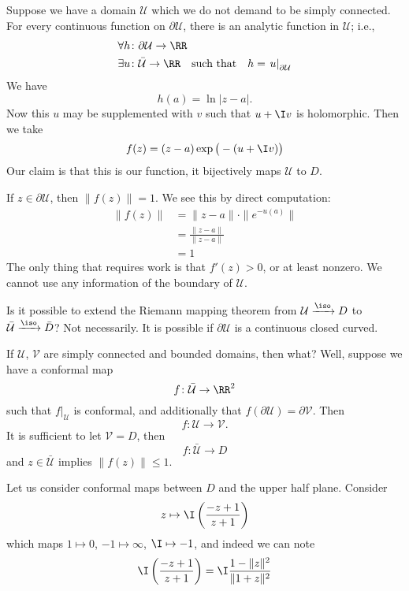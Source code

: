 Suppose we have a domain $\mathcal{U}$ which we do not demand to
be simply connected. For every continuous function on
$\partial\mathcal{U}$, there is an analytic function in
$\mathcal{U}$; i.e.,
\begin{equation}
\begin{split}
&\forall h\colon\partial\mathcal{U}\to\RR\\
&\exists u\colon\bar{\mathcal{U}}\to\RR\quad\mbox{such that}\quad
h=\left.u\right|_{\partial\mathcal{U}}
\end{split}
\end{equation}
We have
\begin{equation}
h(a)=\ln|z-a|.
\end{equation}
Now this $u$ may be supplemented with $v$ such that $u+\I v$ is
holomorphic. Then we take 
\begin{equation}
f(z)=(z-a)\exp\big(-(u+\I v)\big)
\end{equation}
Our claim is that this is our function, it bijectively maps
$\mathcal{U}$ to $D$.

If $z\in\partial\mathcal{U}$, then $\|f(z)\|=1$. We see this by
direct computation:
\begin{subequations}
\begin{align}
\|f(z)\| &= \|z-a\|\cdot\|e^{-u(a)}\|\\
&=\frac{\|z-a\|}{\|z-a\|}\\
&=1
\end{align}
\end{subequations}
The only thing that requires work is that $f'(z)>0$, or at least
nonzero. We cannot use any information of the boundary of
$\mathcal{U}$. 

Is it possible to extend the Riemann mapping theorem from
$\mathcal{U}\xrightarrow{\iso}D$ to
$\bar{\mathcal{U}}\xrightarrow{\iso}\bar{D}$? Not necessarily. It
is possible if $\partial\mathcal{U}$ is a continuous closed
curved.

If $\mathcal{U}$, $\mathcal{V}$ are simply connected and bounded
domains, then what? Well, suppose we have a conformal map
\begin{equation}
f\colon\bar{\mathcal{U}}\to\RR^{2}
\end{equation}
such that $\left.f\right|_{\mathcal{U}}$ is conformal, and
additionally that $f(\partial\mathcal{U})=\partial\mathcal{V}$.
Then
\begin{equation}
f\colon\mathcal{U}\to\mathcal{V}.
\end{equation}
It is sufficient to let $\mathcal{V}=D$, then
\begin{equation}
f\colon\bar{\mathcal{U}}\to D
\end{equation}
and $z\in\bar{\mathcal{U}}$ implies $\|f(z)\|\leq1$.

Let us consider conformal maps between $D$ and the upper half
plane. Consider
\begin{equation}
z\mapsto\I\left(\frac{-z+1}{z+1}\right)
\end{equation}
which maps $1\mapsto 0$, $-1\mapsto\infty$, $\I\mapsto-1$, and
indeed we can note
\begin{equation}
\I\left(\frac{-z+1}{z+1}\right)=\I\frac{1-\|z\|^{2}}{\|1+z\|^{2}}
\end{equation}
